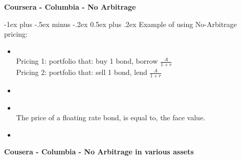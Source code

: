 \documentclass[10pt,landscape]{article}
\makeatletter
\renewcommand{\section}{\@startsection{section}{1}{0mm}%
                                {-1ex plus -.5ex minus -.2ex}%
                                {0.5ex plus .2ex}%
                                {\normalfont\large\bfseries}}
\makeatother
\begin{document}





\newpage

\begin{center}
     \Large{\textbf{Coursera - Columbia - No Arbitrage}} \\
\end{center}

\begin{multicols}{2}
\setlength{\premulticols}{1pt}
\setlength{\postmulticols}{1pt}
\setlength{\multicolsep}{1pt}
\setlength{\columnsep}{2pt}

\section{Example of using No-Arbitrage pricing: }
\begin{itemize}
	\item {}
		\\Pricing 1: portfolio that: buy 1 bond, borrow $\frac{A}{1+r}$
		\\Pricing 2: portfolio that: sell 1 bond, lend $\frac{A}{1+r}$
	\item {}
	\item {}
		\\The price of a floating rate bond, is equal to, the face value.
	\item 
\end{itemize}


			
\end{multicols}


\begin{center}
     \Large{\textbf{Cousera - Columbia - No Arbitrage in various assets}} \\
\end{center}
\end{document}
